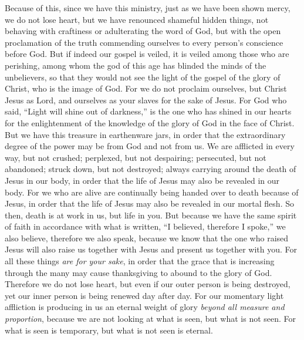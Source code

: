 \begin{biblechapter} %
 Because of this, since we have this ministry, just as we have been shown mercy, we do not lose heart,
\verse but we have renounced shameful hidden things, not behaving with craftiness or adulterating the word of God, but with the open proclamation of the truth commending ourselves to every person’s conscience before God.
\verse But if indeed our gospel is veiled, it is veiled among those who are perishing,
\verse among whom the god of this age has blinded the minds of the unbelievers, so that they would not see the light of the gospel of the glory of Christ, who is the image of God.
\verse For we do not proclaim ourselves, but Christ Jesus as Lord, and ourselves as your slaves for the sake of Jesus.
\verse For God who said, “Light will shine out of darkness,” is the one who has shined in our hearts for the enlightenment of the knowledge of the glory of God in the face of Christ.
 But we have this treasure in earthenware jars, in order that the extraordinary degree of the power may be from God and not from us.
\verse We are afflicted in every way, but not crushed; perplexed, but not despairing;
\verse persecuted, but not abandoned; struck down, but not destroyed;
\verse always carrying around the death of Jesus in our body, in order that the life of Jesus may also be revealed in our body.
\verse For we who are alive are continually being handed over to death because of Jesus, in order that the life of Jesus may also be revealed in our mortal flesh.
\verse So then, death is at work in us, but life in you.
\verse But because we have the same spirit of faith in accordance with what is written, “I believed, therefore I spoke,” we also believe, therefore we also speak,
\verse because we know that the one who raised Jesus will also raise us together with Jesus and present us together with you.
\verse For all these things \textit{are for your sake}, in order that the grace that is increasing through the many may cause thanksgiving to abound to the glory of God.
\verse Therefore we do not lose heart, but even if our outer person is being destroyed, yet our inner person is being renewed day after day.
\verse For our momentary light affliction is producing in us an eternal weight of glory \textit{beyond all measure and proportion},
\verse because we are not looking at what is seen, but what is not seen. For what is seen is temporary, but what is not seen is eternal.
\end{biblechapter}

